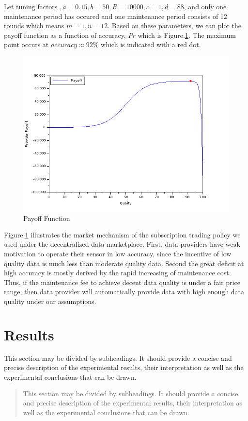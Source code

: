 \documentclass[journal,article,submit,moreauthors,pdftex]{Definitions/mdpi}
\begin{document}
Let tuning factors $, a = 0.15, b = 50, R = 10000, c = 1, d = 88$, and only one maintenance period has occured and one maintenance period consists of 12 rounds which means $m = 1, n = 12$. Based on these parameters, we can plot the payoff function as a function of accuracy, $Pr$ which is Figure.\ref{fig:payoff_pic}. The maximum point occurs at $accuracy \approx 92\%$ which is indicated with a red dot.
\begin{figure}[H] \centering \includegraphics[width=3.3 in]{payoff_pic} \caption{Payoff Function}
    \label{fig:payoff_pic} \end{figure}

Figure.\ref{fig:payoff_pic} illustrates the market mechanism of the subscription trading policy we used under the decentralized data marketplace. First, data providers have weak motivation to operate their sensor in low accuracy, since the incentive of low quality data is much less than moderate quality data. Second the great deficit at high accuracy is mostly derived by the rapid increasing of maintenance cost. Thus, if the maintenance fee to achieve decent data quality is under a fair price range, then data provider will automatically provide data with high enough data quality under our assumptions.


\section{Results}

This section may be divided by subheadings. It should provide a concise and precise description of the experimental results, their interpretation as well as the experimental conclusions that can be drawn.
\begin{quote}
This section may be divided by subheadings. It should provide a concise and precise description of the experimental results, their interpretation as well as the experimental conclusions that can be drawn.
\end{quote}
\end{document}
